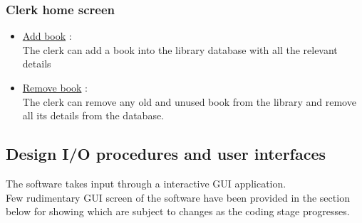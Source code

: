 \documentclass[a4paper]{article}
\begin{document}
\subsubsection*{Clerk home screen}
\begin{itemize}
\item \underline{Add book} :\\ The clerk can add a book into the library database with all the relevant details
\item \underline{Remove book} :\\ The clerk can remove any old and unused book from the library and remove all its details from the database.
\end{itemize}

\subsection{Design I/O procedures and user interfaces}
The software takes input through a interactive GUI application.\\
Few rudimentary GUI screen of the software have been provided in the section below for showing which are subject to changes as the coding stage progresses.
\end{document}
